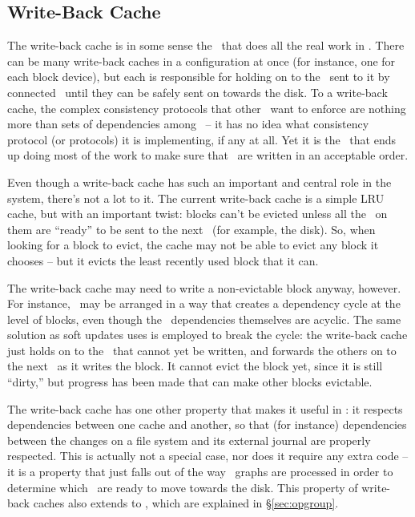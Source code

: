 \subsection{Write-Back Cache}
\label{sec:modules:wbcache}

The write-back cache is in some sense the \module\ that does all the real work
in \Kudos. There can be many write-back caches in a configuration at once (for
instance, one for each block device), but each is responsible for holding on to
the \chdescs\ sent to it by connected \modules\ until they can be safely sent on
towards the disk. To a write-back cache, the complex consistency protocols that
other \modules\ want to enforce are nothing more than sets of dependencies among
\chdescs\ -- it has no idea what consistency protocol (or protocols) it is
implementing, if any at all. Yet it is the \module\ that ends up doing most of
the work to make sure that \chdescs\ are written in an acceptable order.

Even though a write-back cache has such an important and central role in the
system, there's not a lot to it. The current write-back cache is a simple LRU
cache, but with an important twist: blocks can't be evicted unless all the
\chdescs\ on them are ``ready'' to be sent to the next \module\ (for example,
the disk). So, when looking for a block to evict, the cache may not be able to
evict any block it chooses -- but it evicts the least recently used block that
it can.

The write-back cache may need to write a non-evictable block anyway, however.
For instance, \chdescs\ may be arranged in a way that creates a dependency cycle
at the level of blocks, even though the \chdesc\ dependencies themselves are
acyclic. The same solution as soft updates uses is employed to break the cycle:
the write-back cache just holds on to the \chdescs\ that cannot yet be written,
and forwards the others on to the next \module\ as it writes the block. It
cannot evict the block yet, since it is still ``dirty,'' but progress has been
made that can make other blocks evictable.

The write-back cache has one other property that makes it useful in \Kudos: it
respects dependencies between one cache and another, so that (for instance)
dependencies between the changes on a file system and its external journal are
properly respected. This is actually not a special case, nor does it require any
extra code -- it is a property that just falls out of the way \chdesc\ graphs
are processed in order to determine which \chdescs\ are ready to move towards
the disk. This property of write-back caches also extends to \opgroups, which
are explained in \S\ref{sec:opgroup}.


